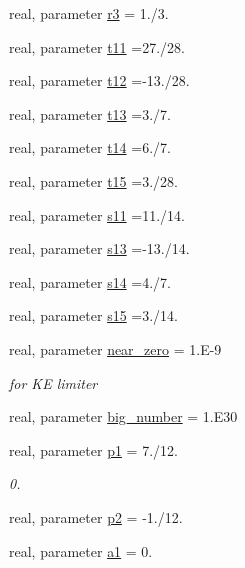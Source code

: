 \begin{DoxyCompactItemize}
\item 
real, parameter \hyperlink{classsw__core__mod_a2311c092079fcb5996c81f6a5bd4a19f}{r3} = 1./3.
\item 
real, parameter \hyperlink{classsw__core__mod_a7be5deda022e38acf1f9d7ec6bfd49e1}{t11} =27./28.
\item 
real, parameter \hyperlink{classsw__core__mod_aae2738361377149fdb4bc680ababd8c8}{t12} =-\/13./28.
\item 
real, parameter \hyperlink{classsw__core__mod_ae3b60da43af913086dbd123f1f66a649}{t13} =3./7.
\item 
real, parameter \hyperlink{classsw__core__mod_a26fc1c57b4befd2a298ccb59ecc89dec}{t14} =6./7.
\item 
real, parameter \hyperlink{classsw__core__mod_a70b3a9054c37076798e133275af2143d}{t15} =3./28.
\item 
real, parameter \hyperlink{classsw__core__mod_ab4edb6c8ca1754ab57e3b7c1dea01c40}{s11} =11./14.
\item 
real, parameter \hyperlink{classsw__core__mod_a2057f706d31454664b7e866bfb212b60}{s13} =-\/13./14.
\item 
real, parameter \hyperlink{classsw__core__mod_a4a938554f9d187f2d74de591f3f2f8e2}{s14} =4./7.
\item 
real, parameter \hyperlink{classsw__core__mod_a5dcd519b6b5b3c1cf2220a199b539a76}{s15} =3./14.
\item 
real, parameter \hyperlink{classsw__core__mod_a8bb76797403fecba5a8dc08930f838f0}{near\-\_\-zero} = 1.E-\/9
\begin{DoxyCompactList}\small\item\em for K\-E limiter \end{DoxyCompactList}\item 
real, parameter \hyperlink{classsw__core__mod_af5edb606364e91428ef3ef7ee98d9d5e}{big\-\_\-number} = 1.E30
\item 
real, parameter \hyperlink{classsw__core__mod_acd7311e0d77f5dd234d3456d70e0741e}{p1} = 7./12.
\begin{DoxyCompactList}\small\item\em 0. \end{DoxyCompactList}\item 
real, parameter \hyperlink{classsw__core__mod_a92790db4a243ddec101790808d27959c}{p2} = -\/1./12.
\item 
real, parameter \hyperlink{classsw__core__mod_aa12b598cb86848b3e2adb065b564997e}{a1} = 0.

\end{DoxyCompactItemize}
